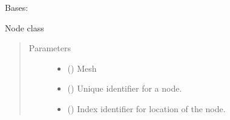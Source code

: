 \documentclass[letterpaper,10pt,english]{sphinxmanual}
\begin{document}
\begin{fulllineitems}
\label{\detokenize{node:node.Node}}
\sphinxAtStartPar
Bases: 

\sphinxAtStartPar
Node class
\begin{quote}\begin{description}
\item[{Parameters}] \leavevmode\begin{itemize}
\item {} 
\sphinxAtStartPar
{} (\sphinxstyleliteralemphasis{\sphinxupquote{ {[}}}\sphinxstyleliteralemphasis{\sphinxupquote{{]}}}) \textendash{} Mesh

\item {} 
\sphinxAtStartPar
{} (\sphinxstyleliteralemphasis{\sphinxupquote{{[}}}\sphinxstyleliteralemphasis{\sphinxupquote{{]}}}) \textendash{} Unique identifier for a node.

\item {} 
\sphinxAtStartPar
{} (\sphinxstyleliteralemphasis{\sphinxupquote{ {[}}}\sphinxstyleliteralemphasis{\sphinxupquote{{]}}}) \textendash{} Index identifier for location of the node.

\end{itemize}

\end{description}\end{quote}

\end{fulllineitems}

\end{document}
